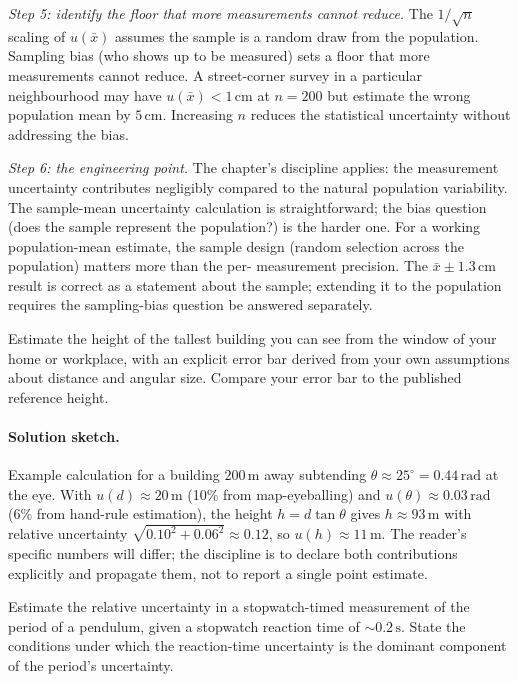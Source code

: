 \emph{Step 5: identify the floor that more measurements cannot
reduce.} The $1/\sqrt{n}$ scaling of $u(\bar{x})$ assumes the
sample is a random draw from the population. Sampling bias (who
shows up to be measured) sets a floor that more measurements
cannot reduce. A street-corner survey in a particular
neighbourhood may have $u(\bar{x}) < 1\,\si{\centi\meter}$ at
$n = 200$ but estimate the wrong population mean by $5\,\si{\centi
\meter}$. Increasing $n$ reduces the statistical uncertainty
without addressing the bias.

\emph{Step 6: the engineering point.} The chapter's discipline
applies: the measurement uncertainty contributes negligibly
compared to the natural population variability. The sample-mean
uncertainty calculation is straightforward; the bias question
(does the sample represent the population?) is the harder one.
For a working population-mean estimate, the sample design (random
selection across the population) matters more than the per-
measurement precision. The $\bar{x} \pm 1.3\,\si{\centi\meter}$
result is correct as a statement about the sample; extending it
to the population requires the sampling-bias question be answered
separately.

\begin{exercise}
Estimate the height of the tallest building you can see from the
window of your home or workplace, with an explicit error bar
derived from your own assumptions about distance and angular
size. Compare your error bar to the published reference height.
\end{exercise}

\paragraph{Solution sketch.}
Example calculation for a building $200 \,\si{\meter}$ away
subtending $\theta \approx 25^{\circ} = 0.44 \,\si{\radian}$ at
the eye. With $u(d) \approx 20 \,\si{\meter}$ (10\% from
map-eyeballing) and $u(\theta) \approx 0.03 \,\si{\radian}$ (6\%
from hand-rule estimation), the height $h = d \tan\theta$ gives
$h \approx 93 \,\si{\meter}$ with relative uncertainty
$\sqrt{0.10^{2} + 0.06^{2}} \approx 0.12$, so $u(h) \approx
11 \,\si{\meter}$. The reader's specific numbers will differ; the
discipline is to declare both contributions explicitly and propagate
them, not to report a single point estimate.

\begin{exercise}
Estimate the relative uncertainty in a stopwatch-timed measurement
of the period of a pendulum, given a stopwatch reaction time of
$\sim 0.2 \,\si{\second}$. State the conditions under which the
reaction-time uncertainty is the dominant component of the
period's uncertainty.
\end{exercise}

